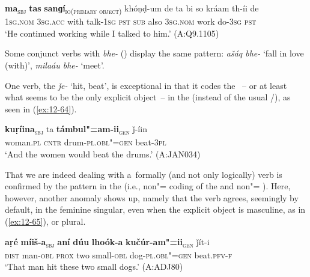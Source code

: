 \begin{exe}
\ex
\label{ex:12-63}
\gll {\ob}\textbf{ma}{\cb}\textsubscript{\textsc{\upshape sbj}} {\ob}\textbf{tas} \textbf{sanɡí}{\cb}\textsubscript{\textsc{\upshape io(primary object)}} khóṇḍ-um de ta bi so kráam th-íi de \\
\textsc{1sg.nom} \textsc{3sg.acc} with talk-\textsc{1sg} \textsc{pst}  \textsc{sub} also \textsc{3sg.nom} work do-\textsc{3sg} \textsc{pst} \\
\glt `He continued working while I talked to him.' (A:Q9.1105)
\end{exe}

Some conjunct verbs with \textit{bhe-} () display the same pattern: \textit{ašáq bhe-} `fall in love (with)', \textit{milaáu bhe-} `meet'.


 One verb, the  \textit{ǰe-} `hit, beat', is exceptional in that it codes the ~-- or at least what seems to be the only explicit object~-- in the  (instead of the usual /), as seen in (\ref{ex:12-64}).

\begin{exe}
\ex
\label{ex:12-64}
\gll {\ob}\textbf{kuṛíina}{\cb}\textsubscript{\textsc{\upshape sbj}} ta {\ob}\textbf{támbul"=am-ii}{\cb}\textsubscript{\textsc{\upshape gen}} ǰ-íin  \\
woman.\textsc{pl} \textsc{cntr} drum-\textsc{pl.obl"=gen} beat-\textsc{3pl}  \\
\glt `And the women would beat the drums.' (A:JAN034)
\end{exe}

That we are indeed dealing with a~formally (and not only logically)  verb is confirmed by the  pattern in the  (i.e., non"= coding of the  and non"= ). Here, however, another anomaly shows up, namely that the verb agrees, seemingly by default, in the feminine singular, even when the explicit object is masculine, as in (\ref{ex:12-65}), or plural.

\begin{exe}
\ex
\label{ex:12-65}
\gll {\ob}\textbf{aṛé} \textbf{míiš-a}{\cb}\textsubscript{\textsc{\upshape sbj}} {\ob}\textbf{aní} \textbf{dúu} \textbf{lhoók-a} \textbf{kučúr-am"=ii}{\cb}\textsubscript{\textsc{\upshape gen}} ǰít-i\\
\textsc{dist} man-\textsc{obl} \textsc{prox} two small-\textsc{obl} dog-\textsc{pl.obl"=gen} beat.\textsc{pfv-f}\\
\glt `That man hit these two small dogs.' (A:ADJ80)
\end{exe}

